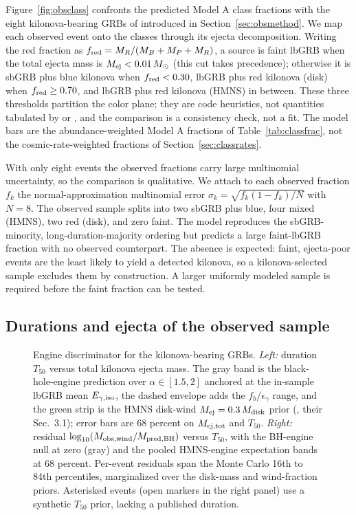 \documentclass[twocolumn,amsmath]{aastex702}
\newcommand{\Msun}{M_\odot}
\newcommand{\Mdisk}{M_{\rm disk}}
\begin{document}
Figure~\ref{fig:obsclass} confronts the predicted Model A class fractions with the
eight kilonova-bearing GRBs of \citet{rastinejad2024} introduced in
Section~\ref{sec:obsmethod}. We map each
observed event onto the \citet{gottlieb2024} classes through its ejecta
decomposition. Writing the red fraction as
$f_{\rm red} = M_R / (M_B + M_P + M_R)$, a source is faint lbGRB when the total
ejecta mass is $M_{\rm ej} < 0.01\,\Msun$ (this cut takes precedence);
otherwise it is sbGRB plus blue kilonova when $f_{\rm red} < 0.30$, lbGRB plus
red kilonova (disk) when $f_{\rm red} \geq 0.70$, and lbGRB plus red
kilonova (HMNS) in between. These three thresholds partition the color plane; they
are code heuristics, not quantities tabulated by \citet{gottlieb2024} or
\citet{rastinejad2024}, and the comparison is a consistency check, not a fit.
The model bars are the abundance-weighted Model A fractions of
Table~\ref{tab:classfrac}, not the cosmic-rate-weighted fractions of
Section~\ref{sec:classrates}.

With only eight events the observed fractions carry large multinomial uncertainty,
so the comparison is qualitative. We attach to each observed fraction $f_k$ the
normal-approximation multinomial error $\sigma_k = \sqrt{f_k(1 - f_k)/N}$ with
$N = 8$. The observed sample splits into two sbGRB plus blue,
four mixed (HMNS), two red (disk), and zero faint. The model reproduces the
sbGRB-minority, long-duration-majority ordering but predicts a large
faint-lbGRB fraction with no observed counterpart. The absence is expected:
faint, ejecta-poor events are the least likely to yield a detected kilonova,
so a kilonova-selected sample excludes them by construction. A larger
uniformly modeled sample is required before the faint fraction can be tested.

\subsection{Durations and ejecta of the observed sample} \label{sec:enginediscriminator}

\begin{figure}[tbp]
\caption{Engine discriminator for the \citet{rastinejad2024} kilonova-bearing
GRBs. \textit{Left:} duration $T_{50}$ versus total kilonova ejecta mass. The
gray band is the black-hole-engine prediction over $\alpha \in [1.5, 2]$
anchored at the in-sample lbGRB mean $E_{\gamma,\rm iso}$, the dashed envelope
adds the $f_b/\epsilon_\gamma$ range, and the green strip is the HMNS disk-wind
$M_{\rm ej} = 0.3\,\Mdisk$ prior (\citealt{gottlieb2024}, their Sec.~3.1); error
bars are 68 percent on $M_{\rm ej,tot}$ and $T_{50}$. \textit{Right:} residual
$\log_{10}(M_{\rm obs,wind}/M_{\rm pred,BH})$ versus $T_{50}$, with the
BH-engine null at zero (gray) and the pooled HMNS-engine expectation bands at 68
percent. Per-event residuals span the Monte Carlo 16th to 84th percentiles,
marginalized over the disk-mass and wind-fraction priors. Asterisked events (open markers in the
right panel) use a synthetic
$T_{50}$ prior, lacking a published duration. \label{fig:enginef1}}
\end{figure}
\end{document}
